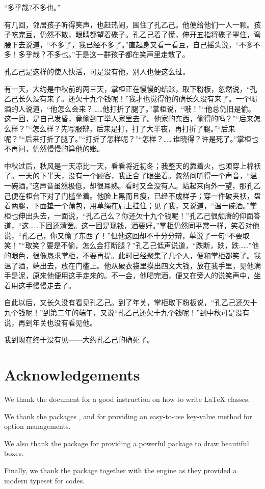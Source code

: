 \documentclass[showbib, lang=zh]{DeanReport}
\begin{document}
“多乎哉?不多也。”

有几回，邻居孩子听得笑声，也赶热闹，围住了孔乙己。他便给他们一人一颗。孩子吃完豆，仍然不散，眼睛都望着碟子。孔乙己着了慌，伸开五指将碟子罩住，弯腰下去说道，“不多了，我已经不多了。”直起身又看一看豆，自己摇头说，“不多不多！多乎哉？不多也。”于是这一群孩子都在笑声里走散了。

孔乙己是这样的使人快活，可是没有他，别人也便这么过。

有一天，大约是中秋前的两三天，掌柜正在慢慢的结账，取下粉板，忽然说，“孔乙己长久没有来了。还欠十九个钱呢！”我才也觉得他的确长久没有来了。一个喝酒的人说道，“他怎么会来？……他打折了腿了。”掌柜说，“哦！”“他总仍旧是偷。这一回，是自己发昏，竟偷到丁举人家里去了。他家的东西，偷得的吗？”“后来怎么样？”“怎么样？先写服辩，后来是打，打了大半夜，再打折了腿。”“后来呢？”“后来打折了腿了。”“打折了怎样呢？”“怎样？……谁晓得？许是死了。”掌柜也不再问，仍然慢慢的算他的账。

中秋过后，秋风是一天凉比一天，看看将近初冬；我整天的靠着火，也须穿上棉袄了。一天的下半天，没有一个顾客，我正合了眼坐着。忽然间听得一个声音，“温一碗酒。”这声音虽然极低，却很耳熟。看时又全没有人。站起来向外一望，那孔乙己便在柜台下对了门槛坐着。他脸上黑而且瘦，已经不成样子；穿一件破夹袄，盘着两腿，下面垫一个蒲包，用草绳在肩上挂住；见了我，又说道，“温一碗酒。”掌柜也伸出头去，一面说，“孔乙己么？你还欠十九个钱呢！”孔乙己很颓唐的仰面答道，“这……下回还清罢。这一回是现钱，酒要好。”掌柜仍然同平常一样，笑着对他说，“孔乙己，你又偷了东西了！”但他这回却不十分分辩，单说了一句“不要取笑！”“取笑？要是不偷，怎么会打断腿？”孔乙己低声说道，“跌断，跌，跌……”他的眼色，很像恳求掌柜，不要再提。此时已经聚集了几个人，便和掌柜都笑了。我温了酒，端出去，放在门槛上。他从破衣袋里摸出四文大钱，放在我手里，见他满手是泥，原来他便用这手走来的。不一会，他喝完酒，便又在旁人的说笑声中，坐着用这手慢慢走去了。

自此以后，又长久没有看见孔乙己。到了年关，掌柜取下粉板说，“孔乙己还欠十九个钱呢！”到第二年的端午，又说“孔乙己还欠十九个钱呢！”到中秋可是没有说，再到年关也没有看见他。

我到现在终于没有见——大约孔乙己的确死了。

\section{Acknowledgements}
    We thank the document \cite{clsguide} for a good instruction on how to write \LaTeX{} classes.

    We thank the packages ,  and  for providing an easy-to-use key-value method for option managements.

    We also thank the package  for providing a powerful package to draw beautiful boxes.

    Finally, we thank the package  together with the engine  as they provided a modern typeset for codes.
\end{document}
